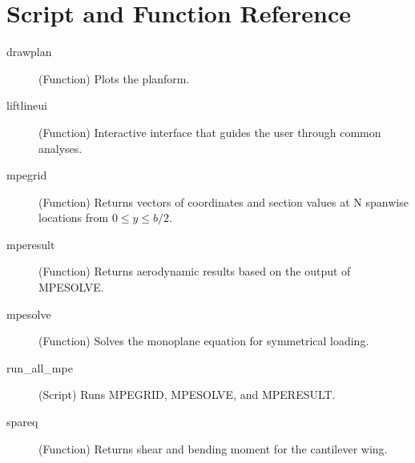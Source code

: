 \documentclass{article}
\begin{document}
\section{Script and Function Reference}
\begin{description}
  
  \item[drawplan] (Function) Plots the planform.

  \item[liftlineui] (Function) Interactive interface that guides the
    user through common analyses.

  \item[mpegrid] (Function) Returns vectors of coordinates and section
    values at N spanwise locations from $0 \leq y \leq b/2$.

  \item[mperesult] (Function) Returns aerodynamic results based on the
    output of MPESOLVE.    

  \item[mpesolve] (Function) Solves the monoplane equation for
    symmetrical loading.

  \item[run\_all\_mpe] (Script) Runs MPEGRID, MPESOLVE, and MPERESULT.

  \item[spareq] (Function) Returns shear and bending moment for the
    cantilever wing.

\end{description}
\newpage
\printbibliography
\end{document}
